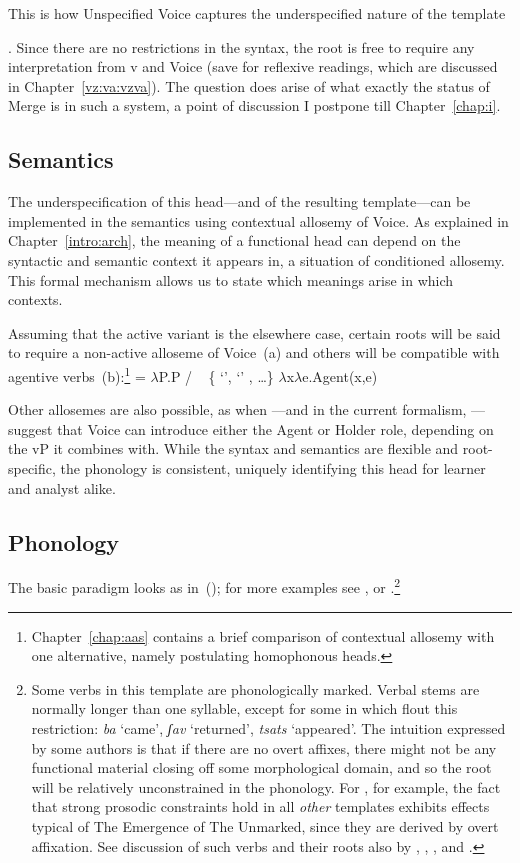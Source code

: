 This is how Unspecified Voice captures the underspecified nature of the template {\tkal. Since there are no restrictions in the syntax, the root is free to require any interpretation from v and Voice (save for reflexive readings, which are discussed in Chapter~\ref{vz:va:vzva}). The question does arise of what exactly the status of Merge is in such a system, a point of discussion I postpone till Chapter~\ref{chap:i}.

		
		\subsection{Semantics} \label{voice:voice:sem}
The underspecification of this head---and of the resulting template---can be implemented in the semantics using contextual allosemy of Voice. As explained in Chapter~\ref{intro:arch}, the meaning of a functional head can depend on the syntactic and semantic context it appears in, a situation of conditioned allosemy. This formal mechanism allows us to state which meanings arise in which contexts.

Assuming that the active variant is the elsewhere case, certain roots will be said to require a non-active alloseme of Voice~(\nextx a) and others will be compatible with agentive verbs~(\nextx b):\footnote{Chapter~\ref{chap:aas} contains a brief comparison of contextual allosemy with one alternative, namely postulating homophonous heads.}
\pex {} = 
	\a $\lambda$P.P \phantom{agent(x,e)xxx} / \trace~ \{  `',  `' , \dots \}
	\a $\lambda$x$\lambda$e.Agent(x,e)
\xe

Other allosemes are also possible, as when \cite{kratzer96}---and in the current formalism, \cite{woodmarantz17}---suggest that Voice can introduce either the Agent or Holder role, depending on the vP it combines with. While the syntax and semantics are flexible and root-specific, the phonology is consistent, uniquely identifying this head for learner and analyst alike.
		
		\subsection{Phonology} \label{voice:voice:phono}
The basic paradigm looks as in~(\nextx); for more examples see \cite{schwarzwald08}, \cite{faust12} or \cite{kastner18nllt}.\footnote{Some verbs in this template are phonologically marked. Verbal stems are normally longer than one syllable, except for some in {\tkal} which flout this restriction:
\ex \emph{ba} `came', \emph{ʃav} `returned', \emph{tsats} `appeared'.
\xe
\label{r1:2:1}The intuition expressed by some authors is that if there are no overt affixes, there might not be any functional material closing off some morphological domain, and so the root will be relatively unconstrained in the phonology. For \cite{ussishkin05}, for example, the fact that strong prosodic constraints hold in all \emph{other} templates exhibits effects typical of The Emergence of The Unmarked, since they are derived by overt affixation. See discussion of such verbs and their roots also by \cite{laks11}, \cite{borer13oup}, \cite{borer15roots}, \cite{tucker15roots} and \cite{kastner18nllt}.}

}
